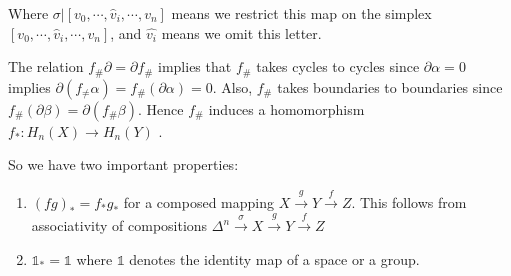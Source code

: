 \documentclass[]{ctexart}
\begin{document}
		Where $\sigma|\left[v_{0}, \cdots, \hat{v}_{i}, \cdots, v_{n}\right]$ means we restrict this map on the simplex $\left[v_{0}, \cdots, \hat{v}_{i}, \cdots, v_{n}\right]$, and $\hat{v_i}$ means we omit this letter. 
		
		The relation $f_{\#} \partial=\partial f_{\#}$ implies that $f_{\#}$ takes cycles to cycles since $\partial \alpha=0$ implies $\partial\left(f_{\neq} \alpha\right)=f_{\#}(\partial \alpha)=0 .$ Also, $f_{\#}$ takes boundaries to boundaries since $f_{\#}(\partial \beta)=\partial\left(f_{\#} \beta\right) .$ Hence $f_{\#}$ induces a homomorphism $f_{*}: H_{n}(X) \rightarrow H_{n}(Y)$ .
		
		So we have two important properties:
			\begin{enumerate}
				\item $(f g)_{*}=f_{*} g_{*}$ for a composed mapping $X \stackrel{g}{\longrightarrow} Y \stackrel{f}{\longrightarrow} Z .$ This follows from associativity of compositions $\Delta^{n} \stackrel{\sigma}{\longrightarrow} X \stackrel{g}{\longrightarrow} Y \stackrel{f}{\longrightarrow} Z$
				\item $\mathds{1}_{*}=\mathds{1}$ where $\mathds{1}$ denotes the identity map of a space or a group.
			\end{enumerate}
		
\end{document}
